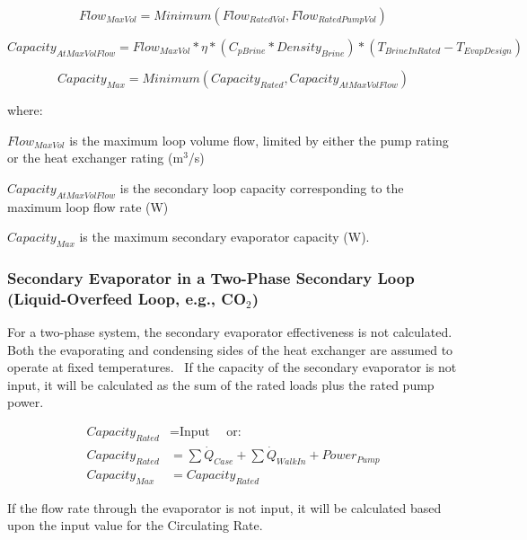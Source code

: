 \begin{equation}
Flow_{MaxVol} = Minimum(Flow_{RatedVol}, Flow_{RatedPumpVol})
\end{equation}

\begin{equation}
Capacity_{AtMaxVolFlow} = Flow_{MaxVol} * \eta *( C_{pBrine} * Density_{Brine})*( T_{BrineInRated} - T_{EvapDesign})
\end{equation}

\begin{equation}
Capacity_{Max} = Minimum(Capacity_{Rated}, Capacity_{AtMaxVolFlow})
\end{equation}

where:

\(Flow_{MaxVol}\) is the maximum loop volume flow, limited by either the pump rating or the heat exchanger rating (m\(^{3}\)/s)

\(Capacity_{AtMaxVolFlow}\) is the secondary loop capacity corresponding to the maximum loop flow rate (W)

\(Capacity_{Max}\) is the maximum secondary evaporator capacity (W).

\subsubsection{Secondary Evaporator in a Two-Phase Secondary Loop~ (Liquid-Overfeed Loop, e.g., CO\(_{2}\))}\label{secondary-evaporator-in-a-two-phase-secondary-loop-liquid-overfeed-loop-e.g.-coux5f2}

For a two-phase system, the secondary evaporator effectiveness is not calculated. Both the evaporating and condensing sides of the heat exchanger are assumed to operate at fixed temperatures.~ If the capacity of the secondary evaporator is not input, it will be calculated as the sum of the rated loads plus the rated pump power.

\begin{equation}
  \begin{array}{rl}
    Capacity_{Rated} &= \text{Input~~~~or:} \\
    Capacity_{Rated} &= \sum \dot{Q}_{Case} + \sum \dot{Q}_{WalkIn} + Power_{Pump} \\
    Capacity_{Max}   &= Capacity_{Rated}
  \end{array}
\end{equation}

If the flow rate through the evaporator is not input, it will be calculated based upon the input value for the Circulating Rate.

